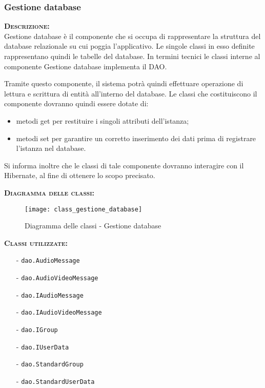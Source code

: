 \subsubsection{Gestione database}
\begin{description}
\item{\scshape\bfseries Descrizione:}\\
Gestione database è il componente che si occupa di rappresentare la struttura del database relazionale su cui poggia l'applicativo. Le singole classi in esso definite rappresentano quindi le tabelle del database. In termini tecnici le classi interne al componente Gestione database implementa il  DAO\@.

Tramite questo componente, il sistema potrà quindi effettuare operazione di lettura e scrittura di entità all'interno del database. Le classi che costituiscono il componente dovranno quindi essere dotate di:

\begin{itemize}
	\item metodi get per restituire i singoli attributi dell'istanza;
	\item metodi set per garantire un corretto inserimento dei dati prima di registrare l'istanza nel database.
\end{itemize}

Si informa inoltre che le classi di tale componente dovranno interagire con il  Hibernate, al fine di ottenere lo scopo precisato.

\item{\scshape\bfseries Diagramma delle classi:}
\begin{figure}[H]
\begin{center}
\texttt{[image: class\_gestione\_database]}
\caption{Diagramma delle classi - Gestione database}\label{fig:gestione_database}
\end{center}
\end{figure}
	
	\item{\scshape\bfseries Classi utilizzate:}
	\begin{itemize}[nolistsep, noitemsep]
	  \item[-] \texttt{dao.AudioMessage}
	  \item[-] \texttt{dao.AudioVideoMessage}
	  \item[-] \texttt{dao.IAudioMessage}
	  \item[-] \texttt{dao.IAudioVideoMessage}
	  \item[-] \texttt{dao.IGroup}
	  \item[-] \texttt{dao.IUserData}
	  \item[-] \texttt{dao.StandardGroup}
	  \item[-] \texttt{dao.StandardUserData}
	\end{itemize}
\end{description}

